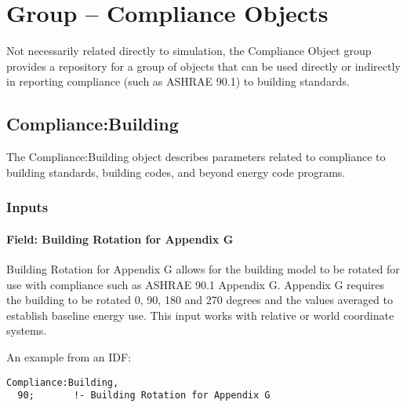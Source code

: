 \section{Group -- Compliance Objects}\label{group-compliance-objects}

Not necessarily related directly to simulation, the Compliance Object group provides a repository for a group of objects that can be used directly or indirectly in reporting compliance (such as ASHRAE 90.1) to building standards.

\subsection{Compliance:Building}\label{compliancebuilding}

The Compliance:Building object describes parameters related to compliance to building standards, building codes, and beyond energy code programs.

\subsubsection{Inputs}\label{inputs-006}

\paragraph{Field: Building Rotation for Appendix G}\label{field-building-rotation-for-appendix-g}

Building Rotation for Appendix G allows for the building model to be rotated for use with compliance such as ASHRAE 90.1 Appendix G. Appendix G requires the building to be rotated 0, 90, 180 and 270 degrees and the values averaged to establish baseline energy use. This input works with relative or world coordinate systems.

An example from an IDF:

\begin{lstlisting}
Compliance:Building,
  90;       !- Building Rotation for Appendix G
\end{lstlisting}
